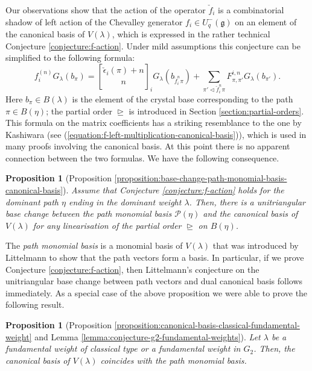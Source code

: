 \documentclass[final]{amsart}
\theoremstyle{plain}
\newtheorem{proposition*}[conjecture*]{Proposition}
\theoremstyle{definition}
\newcommand{\qbinom}{\genfrac{[}{]}{0pt}{}}
\newcommand{\calP}{\mathcal P}
\newcommand{\frakg}{\mathfrak g}
\newcommand{\cf}{\check{f}}
\newcommand{\cepsilon}{\check{\epsilon}}
\begin{document}
Our observations show that the action of the operator $\cf_i$ is a combinatorial shadow of left action of the Chevalley generator $f_i \in U_q^-(\frakg)$ on an element of the canonical basis of $V(\lambda)$, which is expressed in the rather technical Conjecture \ref{conjecture:f-action}.
Under mild assumptions this conjecture can be simplified to the following formula:
\[
        f_i^{(n)} G_\lambda(b_\pi) = \qbinom{\cepsilon_i(\pi)+n}{n}_i G_\lambda(b_{\cf_i^n\pi}) + \sum_{\pi'\triangleleft \cf_i^n\pi} F_{\pi,\pi'}^{i,n} G_\lambda(b_{\pi'}).
\]
Here $b_\pi \in B(\lambda)$ is the element of the crystal base corresponding to the path $\pi \in B(\eta)$; the partial order $\trianglerighteq$ is introduced in Section \ref{section:partial-orders}.
This formula on the matrix coefficients has a striking resemblance to the one by Kashiwara (see (\ref{equation:f-left-multiplication-canonical-basis})), which is used in many proofs involving the canonical basis.
At this point there is no apparent connection between the two formulas.
We have the following consequence.

\begin{proposition*}[Proposition \ref{proposition:base-change-path-monomial-basis-canonical-basis}]
    Assume that Conjecture \ref{conjecture:f-action} holds for the dominant path $\eta$ ending in the dominant weight $\lambda$.
    Then, there is a unitriangular base change between the path monomial basis $\calP(\eta)$ and the canonical basis of $V(\lambda)$ for any linearisation of the partial order $\trianglerighteq$ on $B(\eta)$.
\end{proposition*}

The \emph{path monomial basis} is a monomial basis of $V(\lambda)$ that was introduced by Littelmann \cite{Littelmann:ContractingModules-StandardMonomialTheory} to show that the path vectors form a basis.
In particular, if we prove Conjecture \ref{conjecture:f-action}, then Littelmann's conjecture on the unitriangular base change between path vectors and dual canonical basis follows immediately.
As a special case of the above proposition we were able to prove the following result.

\begin{proposition*}[Proposition \ref{proposition:canonical-basis-classical-fundamental-weight} and Lemma \ref{lemma:conjecture-g2-fundamental-weights}]
    \label{proposition*:canonical-basis-fundamental-weight}
    Let $\lambda$ be a fundamental weight of classical type or a fundamental weight in $G_2$.
    Then, the canonical basis of $V(\lambda)$ coincides with the path monomial basis.
\end{proposition*}
\end{document}
